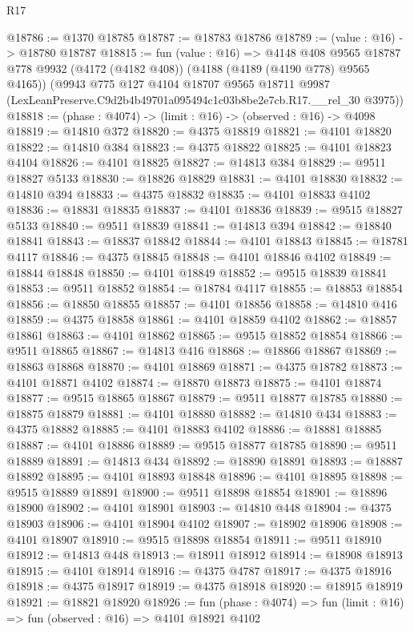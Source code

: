 \begin{lexlean}{R17}
\begin{coremodule}
@18786 := @1370 @18785
@18787 := @18783 @18786
@18789 := (value : @16) -> @18780 @18787
@18815 := fun (value : @16) =>
  @4148
    @408
    @9565
    @18787
    @778
    @9932
    (@4172 (@4182 @408))
    (@4188 (@4189 (@4190 @778) @9565 @4165))
    (@9943
      @775
      @127
      @4104
      @18707
      @9565
      @18711
      @9987
      (LexLeanPreserve.C9d2b4b49701a095494c1c03b8be2e7cb.R17.__rel_30 @3975))
@18818 := (phase : @4074) -> (limit : @16) -> (observed : @16) -> @4098
@18819 := @14810 @372
@18820 := @4375 @18819
@18821 := @4101 @18820
@18822 := @14810 @384
@18823 := @4375 @18822
@18825 := @4101 @18823 @4104
@18826 := @4101 @18825
@18827 := @14813 @384
@18829 := @9511 @18827 @5133
@18830 := @18826 @18829
@18831 := @4101 @18830
@18832 := @14810 @394
@18833 := @4375 @18832
@18835 := @4101 @18833 @4102
@18836 := @18831 @18835
@18837 := @4101 @18836
@18839 := @9515 @18827 @5133
@18840 := @9511 @18839
@18841 := @14813 @394
@18842 := @18840 @18841
@18843 := @18837 @18842
@18844 := @4101 @18843
@18845 := @18781 @4117
@18846 := @4375 @18845
@18848 := @4101 @18846 @4102
@18849 := @18844 @18848
@18850 := @4101 @18849
@18852 := @9515 @18839 @18841
@18853 := @9511 @18852
@18854 := @18784 @4117
@18855 := @18853 @18854
@18856 := @18850 @18855
@18857 := @4101 @18856
@18858 := @14810 @416
@18859 := @4375 @18858
@18861 := @4101 @18859 @4102
@18862 := @18857 @18861
@18863 := @4101 @18862
@18865 := @9515 @18852 @18854
@18866 := @9511 @18865
@18867 := @14813 @416
@18868 := @18866 @18867
@18869 := @18863 @18868
@18870 := @4101 @18869
@18871 := @4375 @18782
@18873 := @4101 @18871 @4102
@18874 := @18870 @18873
@18875 := @4101 @18874
@18877 := @9515 @18865 @18867
@18879 := @9511 @18877 @18785
@18880 := @18875 @18879
@18881 := @4101 @18880
@18882 := @14810 @434
@18883 := @4375 @18882
@18885 := @4101 @18883 @4102
@18886 := @18881 @18885
@18887 := @4101 @18886
@18889 := @9515 @18877 @18785
@18890 := @9511 @18889
@18891 := @14813 @434
@18892 := @18890 @18891
@18893 := @18887 @18892
@18895 := @4101 @18893 @18848
@18896 := @4101 @18895
@18898 := @9515 @18889 @18891
@18900 := @9511 @18898 @18854
@18901 := @18896 @18900
@18902 := @4101 @18901
@18903 := @14810 @448
@18904 := @4375 @18903
@18906 := @4101 @18904 @4102
@18907 := @18902 @18906
@18908 := @4101 @18907
@18910 := @9515 @18898 @18854
@18911 := @9511 @18910
@18912 := @14813 @448
@18913 := @18911 @18912
@18914 := @18908 @18913
@18915 := @4101 @18914
@18916 := @4375 @4787
@18917 := @4375 @18916
@18918 := @4375 @18917
@18919 := @4375 @18918
@18920 := @18915 @18919
@18921 := @18821 @18920
@18926 := fun (phase : @4074) => fun (limit : @16) => fun (observed : @16) => @4101 @18921 @4102

\end{coremodule}
\end{lexlean}
